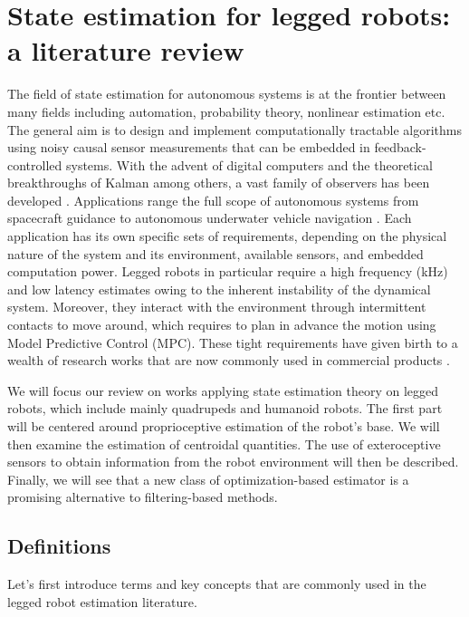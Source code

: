\chapter{State estimation for legged robots: a literature review}
%
The field of state estimation for autonomous systems is at the frontier between many fields including automation, probability theory, nonlinear estimation etc.
The general aim is to design and implement computationally tractable algorithms using noisy causal sensor measurements that can be embedded in feedback-controlled systems.
With the advent of digital computers and the theoretical breakthroughs of Kalman \cite{kalman1960new} among others, a vast family of observers has been developed 
\cite{smith1962application, bellantoni1967square, wan2001unscented, thrun2004simultaneous}. Applications range the full scope of autonomous systems from spacecraft guidance \cite{mcgee1985discovery} 
to autonomous underwater vehicle navigation \cite{leonard2016autonomous}. Each application has its own specific sets of requirements, depending on the physical
nature of the system and its environment, available sensors, and embedded computation power. Legged robots in particular require a high frequency (kHz) 
and low latency estimates owing to the inherent instability of the dynamical system. Moreover, they interact with the environment through 
intermittent contacts to move around, which requires to plan in advance the motion using Model Predictive Control (MPC). These tight requirements 
have given birth to a wealth of research works that are now commonly used in commercial products \cite{hutter2016anymal}.

We will focus our review on works applying state estimation theory on legged robots, which include mainly quadrupeds and humanoid robots. The first part will 
be centered around proprioceptive estimation of the robot's base. We will then examine the estimation of centroidal quantities. The use of exteroceptive sensors
to obtain information from the robot environment will then be described. Finally, we will see that a new class of optimization-based estimator is a promising alternative
to filtering-based methods.

\section{Definitions}
\label{sec:def}
Let's first introduce terms and key concepts that are commonly used in the legged robot estimation literature.

